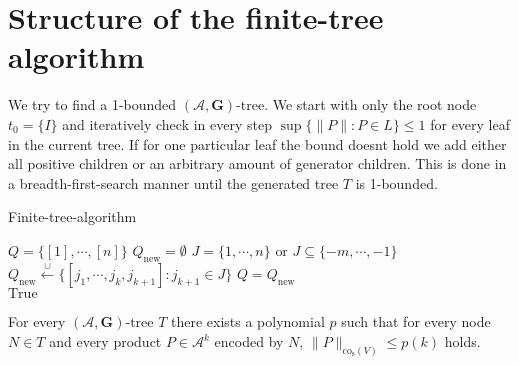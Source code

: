 \section{Structure of the finite-tree algorithm}
We try to find a 1-bounded $(\mathcal{A},\mathbf{G})\text{-tree}$. We start with only the root node $t_0 = \{I\}$ and iteratively check in every step $ \sup \{\lVert P \rVert: P \in L\} \le 1$ for every leaf in the current tree. If for one particular leaf the bound doesnt hold we add either all positive children or an arbitrary amount of generator children. This is done in a breadth-first-search manner until the generated tree $T$ is 1-bounded. 

\vspace{1cm}

\begin{algorithm}[h]
    \caption{Finite-tree-algorithm}
    \label{alg:tree}
    \begin{algorithmic}
        \State $Q = \{[1], \cdots, [n]\}$
            \State $Q_{\text{new}} = \emptyset$
                    \State $J = \{1, \cdots, n\} \text{ or } J \subseteq \{-m, \cdots, -1\}$
                    \State $Q_{\text{new}} \xleftarrow{\cup} \{[j_1,\cdots,j_k,j_{k+1}]: j_{k+1} \in J\}$
                \EndIf
            \EndFor
            \State $Q = Q_{\text{new}}$
        \EndWhile \\
        \Return $\text{True}$
    \end{algorithmic}
  \end{algorithm}

\vspace{3cm}

\begin{lemma}
    \label{lem:poly_bound}
    For every $(\mathcal{A},\mathbf{G})\text{-tree } T$ there exists a polynomial $p$ such that for every node $N \in T$ and every product $P \in \mathcal{A}^k$ encoded by $N$, $\lVert P \rVert _{\text{co}_{\text{s}}(V)} \le p(k)$ holds.
\end{lemma}
  
